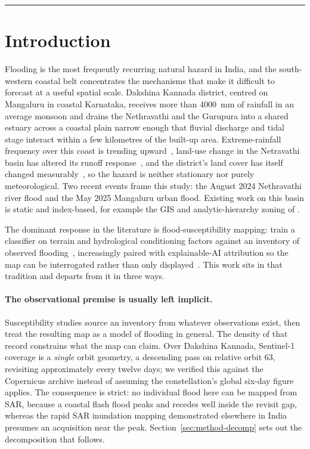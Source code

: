 \documentclass[11pt,a4paper]{article}
\begin{document}
\vspace{4pt}
\hrule
\vspace{10pt}

\section{Introduction}
\label{sec:intro}

Flooding is the most frequently recurring natural hazard in India, and the
south-western coastal belt concentrates the mechanisms that make it difficult to
forecast at a useful spatial scale. Dakshina Kannada district, centred on
Mangaluru in coastal Karnataka, receives more than \SI{4000}{\milli\metre} of
rainfall in an average monsoon and drains the Nethravathi and the Gurupura into a
shared estuary across a coastal plain narrow enough that fluvial discharge and
tidal stage interact within a few kilometres of the built-up area.
Extreme-rainfall frequency over this coast is trending
upward~\citep{chandrashekar2018}, land-use change in the Netravathi basin has
altered its runoff response~\citep{chandana2023,babar2015}, and the district's
land cover has itself changed measurably~\citep{naik2022}, so the hazard is
neither stationary nor purely meteorological. Two recent events frame this study:
the August 2024 Nethravathi river flood and the May 2025 Mangaluru urban flood.
Existing work on this basin is static and index-based, for example the GIS and
analytic-hierarchy zoning of \citet{nirmala2026}.

The dominant response in the literature is flood-susceptibility mapping: train a
classifier on terrain and hydrological conditioning factors against an inventory
of observed flooding~\citep{tehrany2014,khosravi2018,arabameri2019,saha2021},
increasingly paired with explainable-AI attribution so the map can be
interrogated rather than only
displayed~\citep{lundberg2017,aydin2022,seydi2023}. This work sits in that
tradition and departs from it in three ways.

\paragraph{The observational premise is usually left implicit.}
Susceptibility studies source an inventory from whatever observations exist, then
treat the resulting map as a model of flooding in general. The density of that
record constrains what the map can claim. Over Dakshina Kannada,
Sentinel-1~\citep{torres2012} coverage is a \emph{single} orbit geometry, a
descending pass on relative orbit 63, revisiting approximately every twelve days;
we verified this against the Copernicus archive instead of assuming the
constellation's global six-day figure applies. The consequence is strict: no
individual flood here can be mapped from SAR, because a coastal flash flood peaks
and recedes well inside the revisit gap, whereas the rapid SAR inundation mapping
demonstrated elsewhere in India~\citep{arora2023} presumes an acquisition near
the peak. Section~\ref{sec:method-decomp} sets out the decomposition that
follows.
\end{document}
